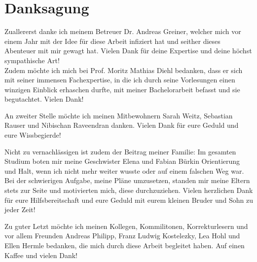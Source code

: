 \chapter{Danksagung}

Zuallererst danke ich meinem Betreuer Dr. Andreas Greiner, welcher mich vor einem Jahr mit der Idee für diese Arbeit infiziert hat und seither dieses Abenteuer mit mir gewagt hat.
Vielen Dank für deine Expertise und deine höchst sympathische Art!\\
Zudem möchte ich mich bei Prof. Moritz Mathias Diehl bedanken, dass er sich mit seiner immensen Fachexpertise, in die ich durch seine Vorlesungen einen winzigen Einblick erhaschen durfte, mit meiner Bachelorarbeit befasst und sie begutachtet. Vielen Dank!

An zweiter Stelle möchte ich meinen Mitbewohnern Sarah Weitz, Sebastian Rauser und Nibischan Raveendran danken.
Vielen Dank für eure Geduld
und eure Wissbegierde!

Nicht zu vernachlässigen ist zudem der Beitrag meiner Familie: Im gesamten Studium boten mir meine Geschwister Elena und Fabian Bürkin Orientierung und Halt, wenn ich nicht mehr weiter wusste oder auf einem falschen Weg war.
Bei der schwierigen Aufgabe, meine Pläne umzusetzen, standen mir meine Eltern stets zur Seite und motivierten mich, diese durchzuziehen. Vielen herzlichen Dank für eure Hilfsbereitschaft und eure Geduld mit eurem kleinen Bruder und Sohn zu jeder Zeit!

Zu guter Letzt möchte ich meinen Kollegen, Kommilitonen, Korrekturlesern und vor allem Freunden Andreas Philipp, Franz Ludwig Kostelezky, Lea Hohl und Ellen Hermle bedanken, die mich durch diese Arbeit begleitet haben. Auf einen Kaffee und vielen Dank!
